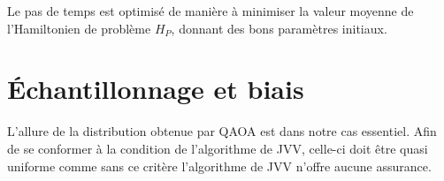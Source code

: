 Le pas de temps est optimisé de manière à minimiser la valeur moyenne de l'Hamiltonien de problème $H_{P}$, donnant des bons paramètres initiaux.


\section{Échantillonnage et biais}
\label{sec:echantillonnage-et-biais}

L'allure de la distribution obtenue par QAOA est dans notre cas essentiel. Afin de se conformer à la condition de l'algorithme de JVV, celle-ci doit être quasi uniforme comme sans ce critère l'algorithme de JVV n'offre aucune assurance.

